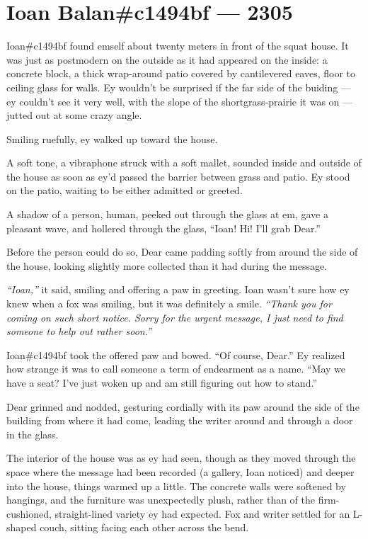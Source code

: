 \chapter*{Ioan Balan\#c1494bf — 2305}

\noindent Ioan\#c1494bf found emself about twenty meters in front of the squat house. It was just as postmodern on the outside as it had appeared on the inside: a concrete block, a thick wrap-around patio covered by cantilevered eaves, floor to ceiling glass for walls. Ey wouldn't be surprised if the far side of the buiding --- ey couldn't see it very well, with the slope of the shortgrass-prairie it was on --- jutted out at some crazy angle.

Smiling ruefully, ey walked up toward the house.

A soft tone, a vibraphone struck with a soft mallet, sounded inside and outside of the house as soon as ey'd passed the barrier between grass and patio. Ey stood on the patio, waiting to be either admitted or greeted.

A shadow of a person, human, peeked out through the glass at em, gave a pleasant wave, and hollered through the glass, ``Ioan! Hi! I'll grab Dear.''

Before the person could do so, Dear came padding softly from around the side of the house, looking slightly more collected than it had during the message.

\emph{``Ioan,''} it said, smiling and offering a paw in greeting. Ioan wasn't sure how ey knew when a fox was smiling, but it was definitely a smile. \emph{``Thank you for coming on such short notice. Sorry for the urgent message, I just need to find someone to help out rather soon.''}

Ioan\#c1494bf took the offered paw and bowed. ``Of course, Dear.'' Ey realized how strange it was to call someone a term of endearment as a name. ``May we have a seat? I've just woken up and am still figuring out how to stand.''

Dear grinned and nodded, gesturing cordially with its paw around the side of the building from where it had come, leading the writer around and through a door in the glass.

The interior of the house was as ey had seen, though as they moved through the space where the message had been recorded (a gallery, Ioan noticed) and deeper into the house, things warmed up a little. The concrete walls were softened by hangings, and the furniture was unexpectedly plush, rather than of the firm-cushioned, straight-lined variety ey had expected. Fox and writer settled for an L-shaped couch, sitting facing each other across the bend.

